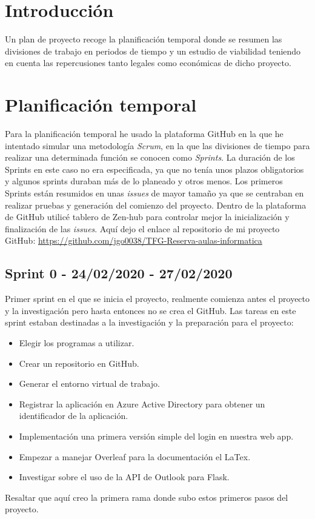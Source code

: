 
\section{Introducción}
Un plan de proyecto recoge la planificación temporal donde se resumen las divisiones de trabajo en periodos de tiempo y un estudio de viabilidad teniendo en cuenta las repercusiones tanto legales como económicas de dicho proyecto.

\section{Planificación temporal}
Para la planificación temporal he usado la plataforma GitHub en la que he intentado simular una metodología \textit{Scrum}, en la que las divisiones de tiempo para realizar una determinada función se conocen como \textit{Sprints}. La duración de los Sprints en este caso no era especificada, ya que no tenía unos plazos obligatorios y algunos sprints duraban más de lo planeado y otros menos. Los primeros Sprints están resumidos en unas \textit{issues} de mayor tamaño ya que se centraban en realizar pruebas y generación del comienzo del proyecto.\newline
Dentro de la plataforma de GitHub utilicé tablero de Zen-hub para controlar mejor la inicialización y finalización de las \textit{issues}.\newline
Aquí dejo el enlace al repositorio de mi proyecto GitHub: \url{https://github.com/jgo0038/TFG-Reserva-aulas-informatica} \newline

\subsection{Sprint 0 - 24/02/2020 - 27/02/2020}
Primer sprint en el que se inicia el proyecto, realmente comienza antes el proyecto y la investigación pero hasta entonces no se crea el GitHub. Las tareas en este sprint estaban destinadas a la investigación y la preparación para el proyecto:
\begin{itemize}
    \item Elegir los programas a utilizar. 
	\item Crear un repositorio en GitHub.
    \item Generar el entorno virtual de trabajo.
    \item Registrar la aplicación en Azure Active Directory para obtener un identificador de la aplicación.
	\item Implementación una primera versión simple del login en nuestra web app.
	\item Empezar a manejar Overleaf para la documentación el LaTex.
	\item Investigar sobre el uso de la API de Outlook para Flask.
\end{itemize}
Resaltar que aquí creo la primera rama donde subo estos primeros pasos del proyecto.
